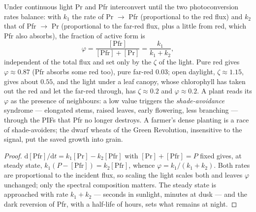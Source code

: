 \begin{proposition}\label{prop:b3:plant-molecular-physiology:photoequilibrium}
Under continuous light Pr and Pfr interconvert until the two
photoconversion rates balance: with $k_{1}$ the rate of Pr $\to$ Pfr
(proportional to the red flux) and $k_{2}$ that of Pfr $\to$ Pr
(proportional to the far-red flux, plus a little from red, which Pfr
also absorbs), the fraction of active form is
\[
\varphi = \frac{[\text{Pfr}]}{[\text{Pfr}] + [\text{Pr}]} = \frac{k_{1}}{k_{1} + k_{2}},
\]
independent of the total flux and set only by the \emph{} $\zeta$ of the light. Pure red gives $\varphi \approx 0.87$ (Pfr
absorbs some red too), pure far-red $0.03$; open daylight, $\zeta \approx
1.15$, gives about $0.55$, and the light under a leaf canopy, whose
chlorophyll has taken out the red and let the far-red through, has
$\zeta \approx 0.2$ and $\varphi \approx 0.2$. A plant reads its
$\varphi$ as the presence of neighbours: a low value triggers the
\emph{shade-avoidance} syndrome --- elongated stems, raised leaves,
early flowering, less branching --- through the PIFs that Pfr no longer
destroys. A farmer's dense planting is a race of shade-avoiders; the
dwarf wheats of the Green Revolution, insensitive to the signal, put the
saved growth into grain.
\end{proposition}
\begin{proof}
$\mathrm{d}[\text{Pfr}]/\mathrm{d}t = k_{1}[\text{Pr}] - k_{2}[\text{Pfr}]$
with $[\text{Pr}] + [\text{Pfr}] = P$ fixed gives, at steady state,
$k_{1}(P - [\text{Pfr}]) = k_{2}[\text{Pfr}]$, whence $\varphi = k_{1}/
(k_{1} + k_{2})$. Both rates are proportional to the incident flux, so
scaling the light scales both and leaves $\varphi$ unchanged; only the
spectral composition matters. The steady state is approached with rate
$k_{1} + k_{2}$ --- seconds in sunlight, minutes at dusk --- and the
dark reversion of Pfr, with a half-life of hours, sets what remains at
night.
\end{proof}

